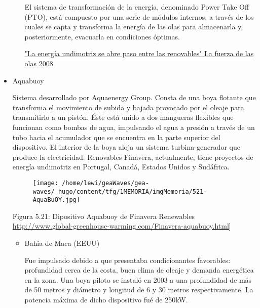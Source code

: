 \begin{itemize}
\begin{itemize}
    El sistema de transformación de la energía, denominado Power Take
    Off (PTO), está compuesto por una serie de módulos internos, a
    través de los cuales se capta y transforma la energía de las olas
    para almacenarla y, posteriormente, evacuarla en condiciones
    óptimas.

    \href{https://www.scribd.com/document/328163965/La-Fuerza-de-Las-Olas}{"La
    energía undimotriz se abre paso entre las renovables" La fuerza de
    las olas 2008}\\
  \end{itemize}
\item
  Aquabuoy

  Sistema desarrollado por Aquaenergy Group. Consta de una boya flotante
  que transforma el movimiento de subida y bajada provocado por el
  oleaje para transmitirlo a un pistón. Éste está unido a dos mangueras
  flexibles que funcionan como bombas de agua, impulsando el agua a
  presión a través de un tubo hacia el acumulador que se encuentra en la
  parte superior del dispositivo. El interior de la boya aloja un
  sistema turbina-generador que produce la electricidad. Renovables
  Finavera, actualmente, tiene proyectos de energía undimotriz en
  Portugal, Canadá, Estados Unidos y Sudáfrica.

  \begin{figure}
  \centering
  \texttt{[image: /home/lewi/geaWaves/gea-waves/\_hugo/content/tfg/1MEMORIA/imgMemoria/521-AquaBuOY.jpg]}
  \caption{}
  \end{figure}

  Figura 5.21: Dipositivo Aquabuoy de Finavera Renewables
  \url{http://www.global-greenhouse-warming.com/Finavera-aquabuoy.html}{]}

  \begin{itemize}
  \item
    Bahia de Maca (EEUU)

    Fue impulsado debido a que presentaba condicionantes favorables:
    profundidad cerca de la costa, buen clima de oleaje y demanda
    energética en la zona. Una boya piloto se instaló en 2003 a una
    profundidad de más de 50 metros y diámetro y longitud de 6 y 30
    metros respectivamente. La potencia máxima de dicho dispositivo fué
    de 250kW.
  \end{itemize}
\end{itemize}

